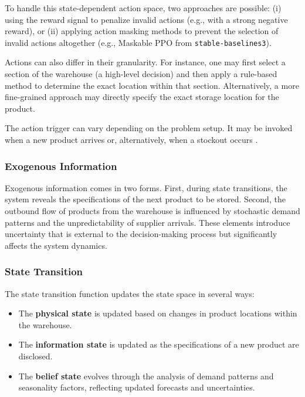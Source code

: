 \documentclass[a4paper,twoside,11pt]{article}
\begin{document}
To handle this state-dependent action space, two approaches are possible: (i) using the reward signal to penalize invalid actions (e.g., with a strong negative reward), or (ii) applying action masking methods to prevent the selection of invalid actions altogether (e.g., Maskable PPO from \texttt{stable-baselines3}).

Actions can also differ in their granularity. For instance, one may first select a section of the warehouse (a high-level decision) and then apply a rule-based method to determine the exact location within that section. Alternatively, a more fine-grained approach may directly specify the exact storage location for the product.

The action trigger can vary depending on the problem setup. It may be invoked when a new product arrives or, alternatively, when a stockout occurs \citep{vries2024exploring}.




\subsubsection*{Exogenous Information}

Exogenous information comes in two forms. First, during state transitions, the system reveals the specifications of the next product to be stored. Second, the outbound flow of products from the warehouse is influenced by stochastic demand patterns and the unpredictability of supplier arrivals. These elements introduce uncertainty that is external to the decision-making process but significantly affects the system dynamics.


\subsubsection*{State Transition}

The state transition function updates the state space in several ways:

\begin{itemize}
    \item The \textbf{physical state} is updated based on changes in product locations within the warehouse.
    \item The \textbf{information state} is updated as the specifications of a new product are disclosed.
    \item The \textbf{belief state} evolves through the analysis of demand patterns and seasonality factors, reflecting updated forecasts and uncertainties.
\end{itemize}
\end{document}
